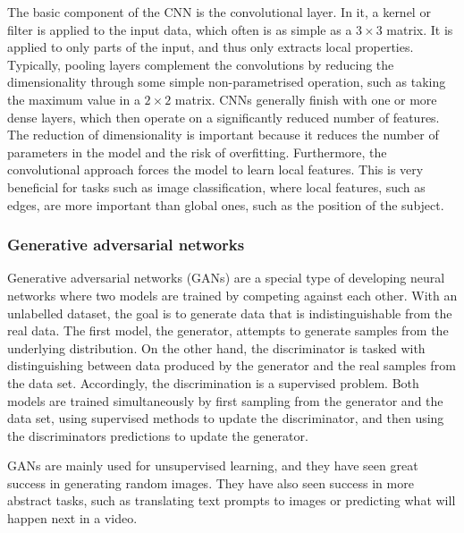 The basic component of the CNN is the convolutional layer.
In it, a kernel or filter is applied to the input data, which often is as simple as a $3 \times 3$ matrix.
It is applied to only parts of the input, and thus only extracts local properties.
Typically, pooling layers complement the convolutions by reducing the dimensionality through some simple non-parametrised operation, such as taking the maximum value in a $2 \times 2$ matrix.
CNNs generally finish with one or more dense layers, which then operate on a significantly reduced number of features.
The reduction of dimensionality is important because it reduces the number of parameters in the model and the risk of overfitting.
Furthermore, the convolutional approach forces the model to learn local features.
This is very beneficial for tasks such as image classification, where local features, such as edges, are more important than global ones, such as the position of the subject.


\subsubsection{Generative adversarial networks}
Generative adversarial networks (GANs) are a special type of developing neural networks where two models are trained by competing against each other.
With an unlabelled dataset, the goal is to generate data that is indistinguishable from the real data.
The first model, the generator, attempts to generate samples from the underlying distribution.
On the other hand, the discriminator is tasked with distinguishing between data produced by the generator and the real samples from the data set.
Accordingly, the discrimination is a supervised problem.
Both models are trained simultaneously by first sampling from the generator and the data set, using supervised methods to update the discriminator, and then using the discriminators predictions to update the generator.

GANs are mainly used for unsupervised learning, and they have seen great success in generating random images.
They have also seen success in more abstract tasks, such as translating text prompts to images or predicting what will happen next in a video.
